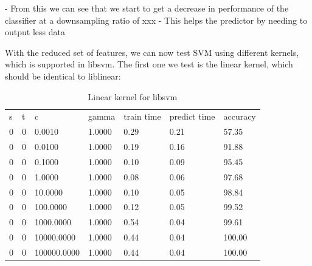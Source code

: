 \documentclass[12pt,oneside]{book}
\begin{document}
- From this we can see that we start to get a decrease in performance
of the classifier at a downsampling ratio of xxx
- This helps the predictor by needing to output less data

%
%

With the reduced set of features, we can now test SVM using different
kernels, which is supported in libsvm.  The first one we test is the
linear kernel, which should be identical to liblinear:


\begin{table}
\begin{tabular}{|l|l|l|l|l|l|l|}
\hline

s               & t               & c               & gamma           & train time      & predict time    & accuracy        \\
0               & 0               & 0.0010          & 1.0000          & 0.29            & 0.21            & 57.35           \\
0               & 0               & 0.0100          & 1.0000          & 0.19            & 0.16            & 91.88           \\
0               & 0               & 0.1000          & 1.0000          & 0.10            & 0.09            & 95.45           \\
0               & 0               & 1.0000          & 1.0000          & 0.08            & 0.06            & 97.68           \\
0               & 0               & 10.0000         & 1.0000          & 0.10            & 0.05            & 98.84           \\
0               & 0               & 100.0000        & 1.0000          & 0.12            & 0.05            & 99.52           \\
0               & 0               & 1000.0000       & 1.0000          & 0.54            & 0.04            & 99.61           \\
0               & 0               & 10000.0000      & 1.0000          & 0.44            & 0.04            & 100.00          \\
0               & 0               & 100000.0000     & 1.0000          & 0.44            & 0.04            & 100.00          \\


\hline
\end{tabular}
\caption{Linear kernel for libsvm}
\label{table:obv-6-libsvm-linear}
\end{table}
\end{document}
